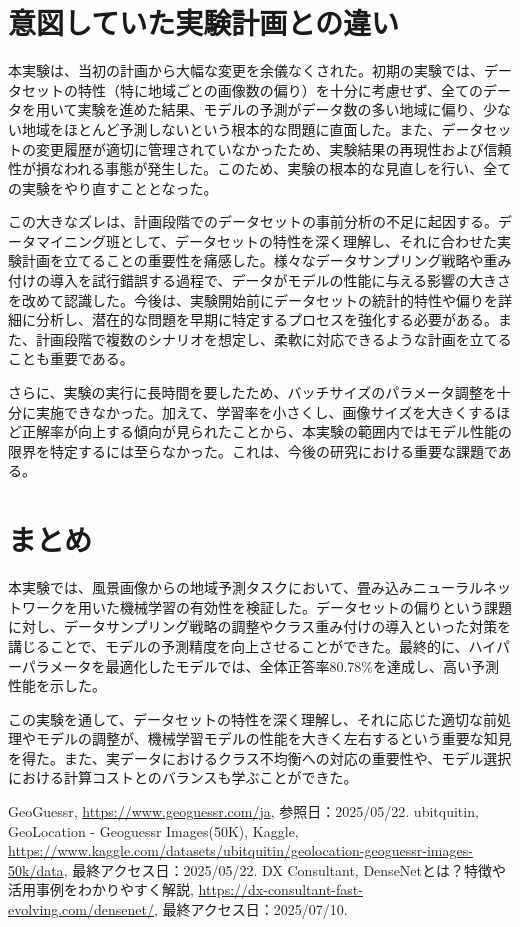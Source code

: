 \documentclass[a4paper, 11pt, titlepage]{jsarticle}
\begin{document}
\section{意図していた実験計画との違い}
本実験は、当初の計画から大幅な変更を余儀なくされた。初期の実験では、データセットの特性（特に地域ごとの画像数の偏り）を十分に考慮せず、全てのデータを用いて実験を進めた結果、モデルの予測がデータ数の多い地域に偏り、少ない地域をほとんど予測しないという根本的な問題に直面した。また、データセットの変更履歴が適切に管理されていなかったため、実験結果の再現性および信頼性が損なわれる事態が発生した。このため、実験の根本的な見直しを行い、全ての実験をやり直すこととなった。

この大きなズレは、計画段階でのデータセットの事前分析の不足に起因する。データマイニング班として、データセットの特性を深く理解し、それに合わせた実験計画を立てることの重要性を痛感した。様々なデータサンプリング戦略や重み付けの導入を試行錯誤する過程で、データがモデルの性能に与える影響の大きさを改めて認識した。今後は、実験開始前にデータセットの統計的特性や偏りを詳細に分析し、潜在的な問題を早期に特定するプロセスを強化する必要がある。また、計画段階で複数のシナリオを想定し、柔軟に対応できるような計画を立てることも重要である。

さらに、実験の実行に長時間を要したため、バッチサイズのパラメータ調整を十分に実施できなかった。加えて、学習率を小さくし、画像サイズを大きくするほど正解率が向上する傾向が見られたことから、本実験の範囲内ではモデル性能の限界を特定するには至らなかった。これは、今後の研究における重要な課題である。

\section{まとめ}
本実験では、風景画像からの地域予測タスクにおいて、畳み込みニューラルネットワークを用いた機械学習の有効性を検証した。データセットの偏りという課題に対し、データサンプリング戦略の調整やクラス重み付けの導入といった対策を講じることで、モデルの予測精度を向上させることができた。最終的に、ハイパーパラメータを最適化したモデルでは、全体正答率80.78\%を達成し、高い予測性能を示した。

この実験を通して、データセットの特性を深く理解し、それに応じた適切な前処理やモデルの調整が、機械学習モデルの性能を大きく左右するという重要な知見を得た。また、実データにおけるクラス不均衡への対応の重要性や、モデル選択における計算コストとのバランスも学ぶことができた。

\begin{thebibliography}{n}
GeoGuessr, \url{https://www.geoguessr.com/ja}, 参照日：2025/05/22.
ubitquitin, GeoLocation - Geoguessr Images(50K), Kaggle, \url{https://www.kaggle.com/datasets/ubitquitin/geolocation-geoguessr-images-50k/data}, 最終アクセス日：2025/05/22.
DX Consultant, DenseNetとは？特徴や活用事例をわかりやすく解説, \url{https://dx-consultant-fast-evolving.com/densenet/}, 最終アクセス日：2025/07/10.
\end{thebibliography}
\end{document}
